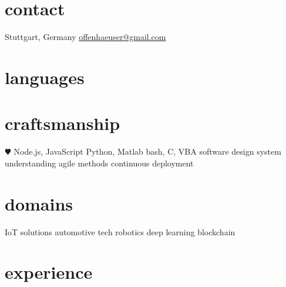 \documentclass[]{friggeri-cv} %
\begin{document}


\begin{aside} %
\section{\color{red}contact}
Stuttgart, Germany
\href{mailto:offenhaeuser@gmail.com}{offenhaeuser@gmail.com}
\section{\color{purple}languages}
\section{\color{green}craftsmanship}
{\color{red} $\varheartsuit$} Node.js, JavaScript
Python, Matlab
bash, C, VBA
software design
system understanding
agile methods
continuous deployment
\section{\color{blue}domains}
IoT solutions
automotive tech
robotics
deep learning
blockchain
\end{aside}


\section{\color{orange}experience}
\end{document}
